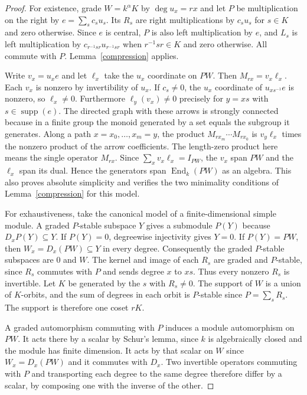 \documentclass[11pt]{amsart}
\theoremstyle{definition}
\newcommand{\supp}{\operatorname{supp}}
\newcommand{\End}{\operatorname{End}}
\begin{document}
\begin{proof}
For existence, grade $W=k^\alpha K$ by $\deg u_x=rx$ and let $P$ be multiplication on the right by $e=\sum_s c_su_s$. Its $R_s$ are right multiplications by $c_su_s$ for $s\in K$ and zero otherwise. Since $e$ is central, $P$ is also left multiplication by $e$, and $L_s$ is left multiplication by $c_{r^{-1}sr}u_{r^{-1}sr}$ when $r^{-1}sr\in K$ and zero otherwise. All commute with $P$. Lemma~\ref{compression} applies.

Write $v_x=u_xe$ and let $\ell_x$ take the $u_x$ coordinate on $PW$. Then $M_{rx}=v_x\ell_x$. Each $v_x$ is nonzero by invertibility of $u_x$. If $c_s\ne0$, the $u_x$ coordinate of $u_{xs^{-1}}e$ is nonzero, so $\ell_x\ne0$. Furthermore $\ell_y(v_x)\ne0$ precisely for $y=xs$ with $s\in\supp(e)$. The directed graph with these arrows is strongly connected because in a finite group the monoid generated by a set equals the subgroup it generates. Along a path $x=x_0,\ldots,x_m=y$, the product $M_{rx_m}\cdots M_{rx_0}$ is $v_y\ell_x$ times the nonzero product of the arrow coefficients. The length-zero product here means the single operator $M_{rx}$. Since $\sum_xv_x\ell_x=I_{PW}$, the $v_x$ span $PW$ and the $\ell_x$ span its dual. Hence the generators span $\End_k(PW)$ as an algebra. This also proves absolute simplicity and verifies the two minimality conditions of Lemma~\ref{compression} for this model.

For exhaustiveness, take the canonical model of a finite-dimensional simple module. A graded $P$-stable subspace $Y$ gives a submodule $P(Y)$ because $D_xP(Y)\subseteq Y$. If $P(Y)=0$, degreewise injectivity gives $Y=0$. If $P(Y)=PW$, then $W_x=D_x(PW)\subseteq Y$ in every degree. Consequently the graded $P$-stable subspaces are $0$ and $W$. The kernel and image of each $R_s$ are graded and $P$-stable, since $R_s$ commutes with $P$ and sends degree $x$ to $xs$. Thus every nonzero $R_s$ is invertible. Let $K$ be generated by the $s$ with $R_s\ne0$. The support of $W$ is a union of $K$-orbits, and the sum of degrees in each orbit is $P$-stable since $P=\sum_sR_s$. The support is therefore one coset $rK$.

A graded automorphism commuting with $P$ induces a module automorphism on $PW$. It acts there by a scalar by Schur's lemma, since $k$ is algebraically closed and the module has finite dimension. It acts by that scalar on $W$ since $W_x=D_x(PW)$ and it commutes with $D_x$. Two invertible operators commuting with $P$ and transporting each degree to the same degree therefore differ by a scalar, by composing one with the inverse of the other.


\end{proof}
\end{document}
